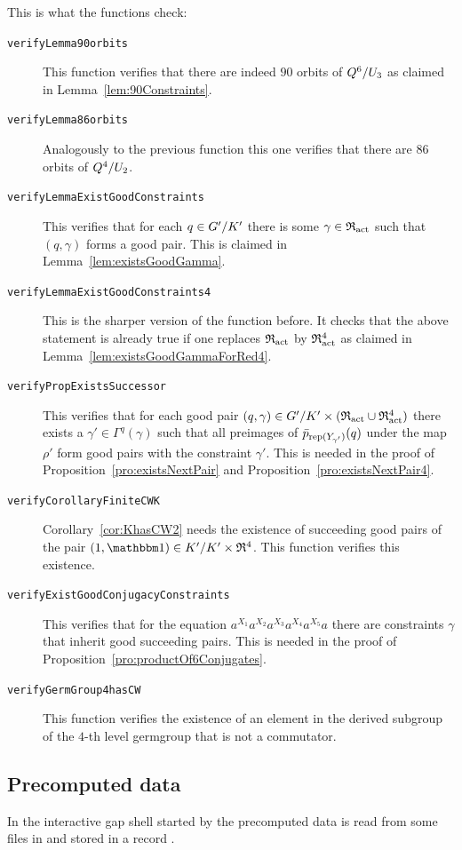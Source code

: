 \documentclass[a4paper,11pt]{amsart}
\begin{document}
This is what the functions check:
\begin{description}
\item[\texttt{verifyLemma90orbits}] This function verifies that there are
  indeed $90$ orbits of ${Q^6/U_3}$ as claimed in 
  Lemma~\ref{lem:90Constraints}. 
\item[\texttt{verifyLemma86orbits}] Analogously to the previous function 
  this one verifies that there are $86$ orbits of ${Q^4/U_2}$. 
\item[\texttt{verifyLemmaExistGoodConstraints}] This verifies that for each 
  $q\in{G'/K'}$ there is some $\gamma\in\mathfrak{R}_{\operatorname{act}}$ such that $(q,\gamma)$ 
  forms a good pair. This is claimed in Lemma~\ref{lem:existsGoodGamma}.
\item[\texttt{verifyLemmaExistGoodConstraints4}] This is the sharper version
  of the function before. It checks that the above statement is already true 
  if one replaces $\mathfrak{R}_{\operatorname{act}}$ by $\mathfrak{R}_{\operatorname{act}}^4$ as claimed in 
  Lemma~\ref{lem:existsGoodGammaForRed4}.
\item[\texttt{verifyPropExistsSuccessor}] This verifies that for
  each good pair $(q,\gamma) \in{G'/K'}\times(\mathfrak{R}_{\operatorname{act}}\cup \mathfrak{R}_{\operatorname{act}}^4)$ there exists 
  a $\gamma'\in\Gamma^q(\gamma)$ such that all preimages of 
  $\bar p_{\operatorname{rep}(Y_{\gamma'})}(q)$ under the map $\rho'$ form
  good pairs with the constraint $\gamma'$. This is needed in the proof of
  Proposition~\ref{pro:existsNextPair} and Proposition~\ref{pro:existsNextPair4}.
\item[\texttt{verifyCorollaryFiniteCWK}] Corollary~\ref{cor:KhasCW2} needs the
  existence of succeeding good pairs of the pair $(1,\id)\in\RNK{K'}{K'}\times\Red^4$.
  This function verifies this existence. 
\item[\texttt{verifyExistGoodConjugacyConstraints}] This verifies that for the equation
  $a^{X_1}a^{X_2}a^{X_3}a^{X_4}a^{X_5}a$ there are constraints $\gamma$ 
  that inherit good succeeding pairs. This is needed in the proof of
  Proposition~\ref{pro:productOf6Conjugates}.
\item[\texttt{verifyGermGroup4hasCW}] This function verifies the existence of 
  an element in the derived subgroup of the $4$-th level germgroup that is not a commutator.
\end{description}

\subsection{Precomputed data}\label{sec:precomputation}
In the interactive gap shell started by 
the precomputed data is read from some files in  and stored in 
a record . 
\end{document}
